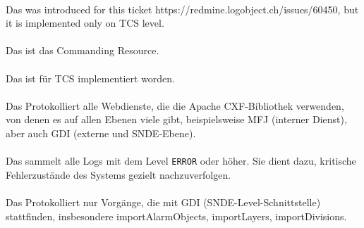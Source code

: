 \paragraph{\mlogisticsCommandingLog}
Das \texttt{\mlogisticsCommandingLog} was introduced for this ticket https://redmine.logobject.ch/issues/60450, but it is implemented only on TCS level.

\paragraph{\mlogisticsCommandingCacheLog}
Das \texttt{\mlogisticsCommandingCacheLog} ist das Commanding Resource.

\paragraph{\mlogisticsCommandingDebugLog}
Das \texttt{\mlogisticsCommandingDebugLog} ist für TCS implementiert worden.

\paragraph{\mlogisticsCxfLog}
Das \texttt{\mlogisticsCxfLog}  Protokolliert alle Webdienste, die die Apache CXF-Bibliothek verwenden, von denen es auf allen Ebenen viele gibt, beispielsweise MFJ (interner Dienst), aber auch GDI (externe und SNDE-Ebene).

\paragraph{\mlogisticsErrorLog}
Das \texttt{\mlogisticsErrorLog} sammelt alle Logs mit dem Level \texttt{ERROR} oder höher. Sie dient dazu, kritische Fehlerzustände des Systems gezielt nachzuverfolgen.

\paragraph{\mlogisticsGdiImportLog}
Das \texttt{\mlogisticsGdiImportLog} Protokolliert nur Vorgänge, die mit GDI (SNDE-Level-Schnittstelle) stattfinden, insbesondere importAlarmObjects, importLayers, importDivisions.

